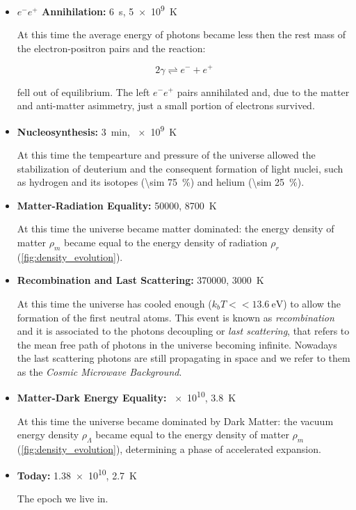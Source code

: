 \begin{itemize}
        \item \textbf{$e^-e^+$ Annihilation:} \SI{6}{\second},
        \SI{5e9}{\kelvin}

        At this time the average energy of photons became less then the rest mass
        of the electron-positron pairs and the reaction:

        \begin{equation}
                2\gamma \rightleftharpoons e^- + e^+
        \end{equation}

        fell out of equilibrium. The left $e^-e^+$ pairs annihilated and,
        due to the matter and anti-matter asimmetry, just a small portion
        of electrons survived.

        \item \textbf{Nucleosynthesis:} \SI{3}{\minute}, \SI{e9}{\kelvin}

        At this time the tempearture and pressure of the universe allowed
        the stabilization of deuterium and the consequent formation of
        light nuclei, such as hydrogen and its isotopes
        (\SI{\sim 75}{\percent}) and helium (\SI{\sim 25}{\percent}).

        \item \textbf{Matter-Radiation Equality:} \SI{50000}{\year},
        \SI{8700}{\kelvin}

        At this time the universe became matter dominated: the energy
        density of matter $\rho_m$ became equal to the energy density of
        radiation $\rho_r$ (\autoref{fig:density_evolution}).

        \item \textbf{Recombination and Last Scattering:} \SI{370000}{\year},
        \SI{3000}{\kelvin}

        At this time the universe has cooled enough ($k_bT <<
        \SI{13.6}{\electronvolt}$) to allow the formation of the first
        neutral atoms. This event is known as \emph{recombination} and it is
        associated to the photons decoupling or \emph{last scattering}, that
        refers to the mean free path of photons in the universe becoming
        infinite. Nowadays the last scattering photons are still propagating in
        space and we refer to them as the \emph{Cosmic Microwave Background}.

        \item \textbf{Matter-Dark Energy Equality:} \SI{e10}{\year},
        \SI{3.8}{\kelvin}

        At this time the universe became dominated by Dark Matter: the
        vacuum energy density $\rho_\Lambda$ became equal to the energy density of
        matter $\rho_m$ (\autoref{fig:density_evolution}), determining a
        phase of accelerated expansion.

        \item \textbf{Today:} \SI{1.38e10}{\year}, \SI{2.7}{\kelvin}

        The epoch we live in.
\end{itemize}

